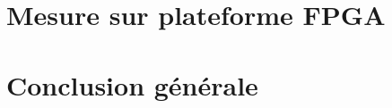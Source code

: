 \documentclass[12pt,a4paper]{article}
\begin{document}



\newpage

\section{Mesure sur plateforme FPGA}




\newpage

\section{Conclusion générale}

\end{document}

